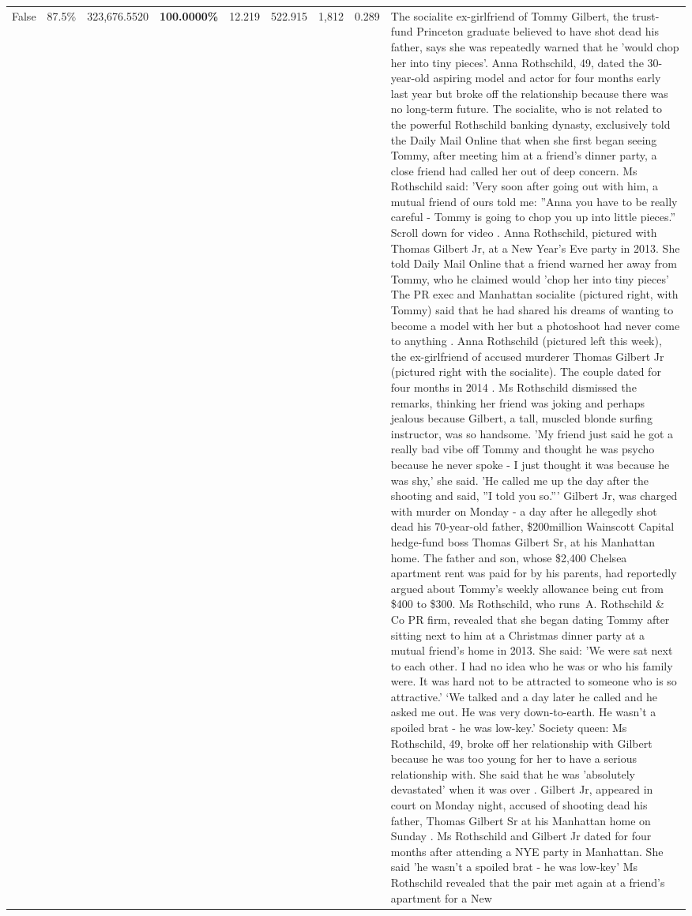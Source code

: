 \begin{table}[H]
\begin{tabular}{lllrlllll}
False & 87.5\% & 323,676.5520 & \bfseries \color{red} 100.0000\% & 12.219 & 522.915 & 1,812 & 0.289 & The socialite ex-girlfriend of Tommy Gilbert, the trust-fund Princeton graduate believed to have shot dead his father, says she was repeatedly warned that he 'would chop her into tiny pieces'. Anna Rothschild, 49, dated the 30-year-old aspiring model and actor for four months early last year but broke off the relationship because there was no long-term future. The socialite, who is not related to the powerful Rothschild banking dynasty, exclusively told the Daily Mail Online that when she first began seeing Tommy, after meeting him at a friend's dinner party, a close friend had called her out of deep concern. Ms Rothschild said: 'Very soon after going out with him, a mutual friend of ours told me: ''Anna you have to be really careful - Tommy is going to chop you up into little pieces.'' Scroll down for video . Anna Rothschild, pictured with Thomas Gilbert Jr, at a New Year's Eve party in 2013. She told Daily Mail Online that a friend warned her away from Tommy, who he claimed would 'chop her into tiny pieces' The PR exec and Manhattan socialite (pictured right, with Tommy) said that he had shared his dreams of wanting to become a model with her but a photoshoot had never come to anything . Anna Rothschild (pictured left this week), the ex-girlfriend of accused murderer Thomas Gilbert Jr (pictured right with the socialite). The couple dated for four months in 2014 . Ms Rothschild dismissed the remarks, thinking her friend was joking and perhaps jealous because Gilbert, a tall, muscled blonde surfing instructor, was so handsome. 'My friend just said he got a really bad vibe off Tommy and thought he was psycho because he never spoke - I just thought it was because he was shy,' she said. 'He called me up the day after the shooting and said, ''I told you so.''' Gilbert Jr, was charged with murder on Monday - a day after he allegedly shot dead his 70-year-old father, \$200million Wainscott Capital hedge-fund boss Thomas Gilbert Sr, at his Manhattan home. The father and son, whose \$2,400 Chelsea apartment rent was paid for by his parents, had reportedly argued about Tommy's weekly allowance being cut from \$400 to \$300. Ms Rothschild, who runs A. Rothschild \& Co PR firm, revealed that she began dating Tommy after sitting next to him at a Christmas dinner party at a mutual friend's home in 2013. She said: 'We were sat next to each other. I had no idea who he was or who his family were. It was hard not to be attracted to someone who is so attractive.' ‘We talked and a day later he called and he asked me out. He was very down-to-earth. He wasn’t a spoiled brat - he was low-key.’ Society queen: Ms Rothschild, 49, broke off her relationship with Gilbert because he was too young for her to have a serious relationship with. She said that he was 'absolutely devastated' when it was over . Gilbert Jr, appeared in court on Monday night, accused of shooting dead his father, Thomas Gilbert Sr at his Manhattan home on Sunday . Ms Rothschild and Gilbert Jr dated for four months after attending a NYE party in Manhattan. She said 'he wasn't a spoiled brat - he was low-key' Ms Rothschild revealed that the pair met again at a friend’s apartment for a New 
\end{tabular}
\end{table}
